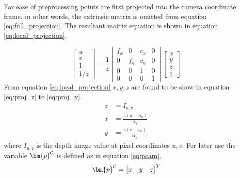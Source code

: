         For ease of preprocessing points are first projected into the camera coordinate frame, in other words, the extrinsic matrix is omitted from equation \ref{eq:full_projection}.
        The resultant matrix equation is shown in equation \ref{eq:local_projection}.

        \begin{equation} \label{eq:local_projection}
            \begin{bmatrix}
                u \\
                v \\
                1 \\
                1/z
            \end{bmatrix}
            = \frac{1}{z}
            \begin{bmatrix}
                f_x & 0 & c_x & 0 \\
                0 & f_y & c_y & 0 \\
                0 & 0 & 1 & 0 \\
                0 & 0 & 0 & 1
            \end{bmatrix}
            \begin{bmatrix}
                x\\
                y\\
                z\\
                1
            \end{bmatrix}
        \end{equation}
        From equation \ref{eq:local_projection} \(x,y,z\) are found to be show in equation \ref{eq:proj_z} to \ref{eq:proj_y}.
        \begin{align}
            z &= I_{u,v} \label{eq:proj_z}\\[0.2cm]
            x &= \frac{z(u - u_0)}{\alpha_x}\label{eq:proj_x} \\
            y &= \frac{z(v - v_0)}{\alpha_y}\label{eq:proj_y}
        \end{align}
        where \(I_{u,v}\) is the depth image value at pixel coordinates \(u,v\). For later use the variable \(\bm{p} \inrefframe{C}\) is defined as in equation \ref{eq:pcam},
        \begin{equation}\label{eq:pcam}
            \bm{p}\inrefframe{C}=
            \begin{bmatrix}
                x &y &z
            \end{bmatrix}^T
        \end{equation}

